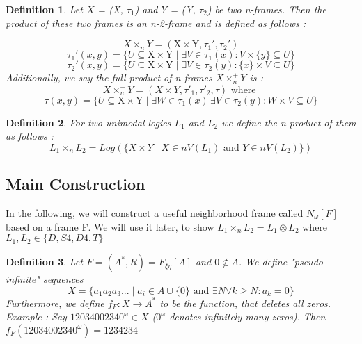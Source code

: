\documentclass[12pt, a4paper]{scrartcl}
\newtheorem{definition}{Definition}[subsection]
\begin{document}
\vspace{0.5cm}

\begin{definition}
    Let $X$ = (X, $\tau_1$) and $Y$ = (Y, $\tau_2$) be two n-frames. Then the product of these two frames
    is an n-2-frame and is defined as follows : \newline
    
    $$ X \times_n Y = (\mbox{X} \times \mbox{Y}, \tau_1', \tau_2')$$   
    $$ \tau_1'(x,y) = \{ U \subseteq \mbox{X} \times \mbox{Y} \mid \exists V \in \tau_1(x) : V \times  \{ y \} \subseteq U \}$$
    $$ \tau_2'(x,y) = \{ U \subseteq \mbox{X} \times \mbox{Y} \mid \exists V \in \tau_2(y) : \{ x \} \times V \subseteq U \}$$
    Additionally, we say the full product of n-frames $X \times^+_n Y$ is :
    $$ X \times^+_n Y = (X \times Y, \tau'_1, \tau'_2, \tau)\mbox{ where }$$
    $$ \tau(x,y) = \{ U \subseteq \mbox{X} \times \mbox{Y} \mid \exists W \in \tau_1(x) \, \exists V \in \tau_2(y) : W \times V \subseteq U \}$$        
\end{definition}

\begin{definition}
    For two unimodal logics $L_1$ and $L_2$ we define the n-product of them as follows :
    $$ L_1 \times_n L_2 = Log(\{ X \times Y \mid X \in nV(L_1) \mbox{ and } Y \in nV(L_2) \})$$        
\end{definition}



\subsection{Main Construction}
In the following, we will construct a useful neighborhood frame called $N_\omega[F]$ based on a frame F.
We will use it later, to show $L_1 \times_n L_2 = L_1 \otimes L_2$ where $L_1,L_2 \in \{D,S4,D4,T\}$

\begin{definition}
    Let $F = (A^*, R) = F_{\xi \eta}[A]$ and $0 \notin A$. We define "pseudo-infinite" sequences 
    $$X = \{a_1a_2a_3... \mid a_i \in A \cup \{0\} \mbox{ and } \exists N \forall k \geq N : a_k = 0\}$$
    Furthermore, we define $f_F : X \rightarrow A^*$ to be the function, that deletes all zeros. \newline \newline
    Example : Say $12034002340^\omega \in X$ ($0^\omega$ denotes infinitely many zeros). Then $f_F(12034002340^\omega) = 1234234$

\end{definition}
\end{document}
